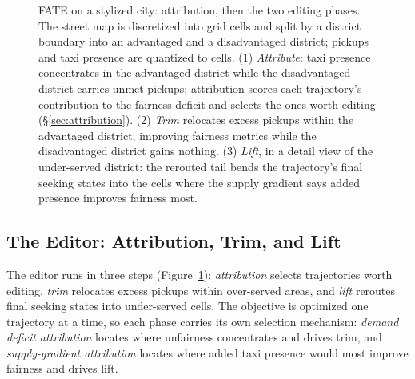 \begin{figure}[t]
  \centering
  
  \caption{FATE on a stylized city: attribution, then the two editing
  phases. The street map is discretized into grid cells and split by a
  district boundary into an advantaged and a disadvantaged district;
  pickups and taxi presence are quantized to cells. (1) \emph{Attribute}:
  taxi presence concentrates in the advantaged district while the
  disadvantaged district carries unmet pickups; attribution scores each
  trajectory's contribution to the fairness deficit and selects the ones
  worth editing (\S\ref{sec:attribution}). (2) \emph{Trim} relocates excess
  pickups within the advantaged district, improving fairness metrics while
  the disadvantaged district gains nothing. (3) \emph{Lift}, in a detail
  view of the under-served district: the rerouted tail bends the
  trajectory's final seeking states into the cells where the supply
  gradient says added presence improves fairness most.}
  \label{fig:overview}
\end{figure}
\subsection{The Editor: Attribution, Trim, and Lift}\label{sec:editor}

\label{sec:attribution}%
The editor runs in three steps (Figure~\ref{fig:overview}):
\emph{attribution} selects trajectories worth editing, \emph{trim}
relocates excess pickups within over-served areas, and \emph{lift}
reroutes final seeking states into under-served cells. The objective is
optimized one trajectory at a time, so each phase carries its own
selection mechanism: \emph{demand deficit attribution} locates where
unfairness concentrates and drives trim, and \emph{supply-gradient
attribution} locates where added taxi presence would most improve fairness
and drives lift.

